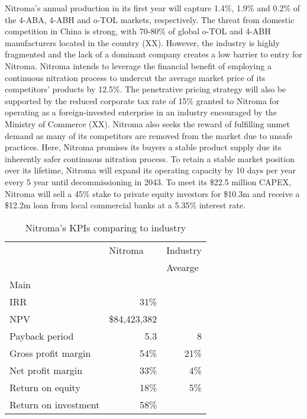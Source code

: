 Nitroma’s annual production in its first year will capture 1.4\%, 1.9\% and 0.2\% of the 4-ABA, 4-ABH and o-TOL markets, respectively. The threat from domestic competition in China is strong, with 70-80\% of global o-TOL and 4-ABH manufacturers located in the country (XX). However, the industry is highly fragmented and the lack of a dominant company creates a low barrier to entry for Nitroma. Nitroma intends to leverage the financial benefit of employing a continuous nitration process to undercut the average market price of its competitors’ products by 12.5\%.  The penetrative pricing strategy will also be supported by the reduced corporate tax rate of 15\% granted to Nitroma for operating as a foreign-invested enterprise in an industry encouraged by the Ministry of Commerce (XX). Nitroma also seeks the reward of fulfilling unmet demand as many of its competitors are removed from the market due to unsafe practices. Here, Nitroma promises its buyers a stable product supply due its inherently safer continuous nitration process. To retain a stable market position over its lifetime, Nitroma will expand its operating capacity by 10 days per year every 5 year until decommissioning in 2043. To meet its \$22.5 million CAPEX, Nitroma will sell a 45\% stake to private equity investors for \$10.3m and receive a \$12.2m loan from local commercial banks at a 5.35\% interest rate.
\begin{wraptable}{r}{8cm}
\centering
\caption{Nitroma's KPIs comparing to industry}
\label{KPI-ES}
\begin{tabular}{l|r|l}
\hline
\textbf{}            & \multicolumn{1}{l|}{Nitroma} & \multicolumn{1}{c}{Industry} \\
                     & \multicolumn{1}{l|}{}        & Avearge                      \\ \hline
Main                 & \multicolumn{1}{l|}{}        &                              \\
IRR                  & 31\%                         &                              \\
NPV                  & \$84,423,382                 &                              \\
Payback period       & 5.3                          & \multicolumn{1}{r}{8}      \\
Gross profit margin  & 54\%                         & \multicolumn{1}{r}{21\%}   \\
Net profit margin    & 33\%                         & \multicolumn{1}{r}{4\%}    \\
Return on equity     & 18\%                         & \multicolumn{1}{r}{5\%}   \\
Return on investment & 58\%                         &                              \\ \hline
\end{tabular}
\end{wraptable}



